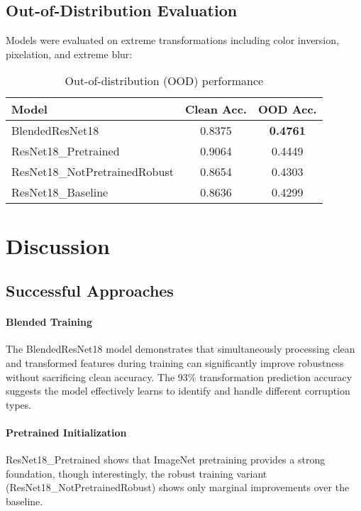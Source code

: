 \documentclass[11pt,a4paper]{article}
\begin{document}
\subsection{Out-of-Distribution Evaluation}

Models were evaluated on extreme transformations including color inversion, pixelation, and extreme blur:

\begin{table}[H]
\centering
\caption{Out-of-distribution (OOD) performance}
\begin{tabular}{lcc}
\toprule
Model & Clean Acc. & OOD Acc. \\
\midrule
BlendedResNet18 & 0.8375 & \textbf{0.4761} \\
ResNet18\_Pretrained & 0.9064 & 0.4449 \\
ResNet18\_NotPretrainedRobust & 0.8654 & 0.4303 \\
ResNet18\_Baseline & 0.8636 & 0.4299 \\
\bottomrule
\end{tabular}
\end{table}

\section{Discussion}

\subsection{Successful Approaches}

\paragraph{Blended Training}
The BlendedResNet18 model demonstrates that simultaneously processing clean and transformed features during training can significantly improve robustness without sacrificing clean accuracy. The 93\% transformation prediction accuracy suggests the model effectively learns to identify and handle different corruption types.

\paragraph{Pretrained Initialization}
ResNet18\_Pretrained shows that ImageNet pretraining provides a strong foundation, though interestingly, the robust training variant (ResNet18\_NotPretrainedRobust) shows only marginal improvements over the baseline.
\end{document}
